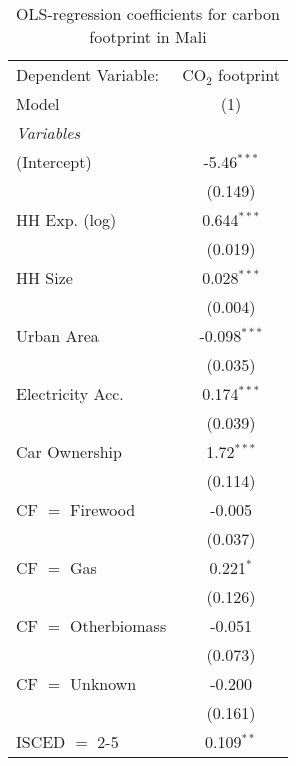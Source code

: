
\begin{table}[htbp!]
   \centering
   \small
   \begin{adjustbox}{width = 1\textwidth, max height = 0.95\textheight, center}
      \begin{threeparttable}[b]
         \caption{\label{tab:OLS_2_MLI} OLS-regression coefficients for carbon footprint in Mali}
         \begin{tabular}{lc}
            \tabularnewline \midrule \midrule
            Dependent Variable: & CO$_{2}$ footprint\\  
            Model               & (1)\\  
            \midrule
            \emph{Variables}\\
            (Intercept)         & -5.46$^{***}$\\   
                                & (0.149)\\   
            HH Exp. (log)       & 0.644$^{***}$\\   
                                & (0.019)\\   
            HH Size             & 0.028$^{***}$\\   
                                & (0.004)\\   
            Urban Area          & -0.098$^{***}$\\   
                                & (0.035)\\   
            Electricity Acc.    & 0.174$^{***}$\\   
                                & (0.039)\\   
            Car Ownership       & 1.72$^{***}$\\   
                                & (0.114)\\   
            CF $=$ Firewood     & -0.005\\   
                                & (0.037)\\   
            CF $=$ Gas          & 0.221$^{*}$\\   
                                & (0.126)\\   
            CF $=$ Otherbiomass & -0.051\\   
                                & (0.073)\\   
            CF $=$ Unknown      & -0.200\\   
                                & (0.161)\\   
            ISCED $=$ 2-5       & 0.109$^{**}$\\   

\end{tabular}
\end{threeparttable}
\end{adjustbox}
\end{table}
